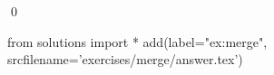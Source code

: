 
\begin{ex} 
  \label{ex:merge}
  
  \qed
\end{ex} 
\begin{python0}
from solutions import *
add(label="ex:merge",
    srcfilename='exercises/merge/answer.tex') 
\end{python0}
